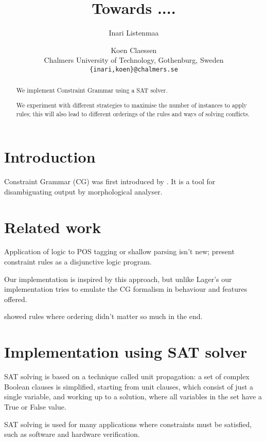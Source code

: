 \documentclass[11pt]{article}
\title{Towards ....}
\author{Inari Listenmaa \and Koen Claessen \\
  Chalmers University of Technology, Gothenburg, Sweden \\
  {\tt \{inari,koen\}@chalmers.se} }
\date{}
\begin{document}
\maketitle
\begin{abstract}
We implement Constraint Grammar using a SAT solver.

We experiment with different strategies to maximise the number of instances to apply rules;
this will also lead to different orderings of the rules and ways of solving conflicts.


\end{abstract}


\section{Introduction}
Constraint Grammar (CG) was first introduced by \cite{karlsson1995constraint}. 
It is a tool for disambiguating output by morphological analyser.


\section{Related work}
\label{sect:related}

Application of logic to POS tagging or shallow parsing isn't new;
\cite{lager98, lager_nivre01} present constraint rules as 
a disjunctive logic program.

Our implementation is inspired by this approach,
but unlike Lager's our implementation tries to emulate the CG
formalism in behaviour and features offered.

\cite{lager01transformation} showed rules where ordering didn't matter so much in the end.



\section{Implementation using SAT solver}
\label{sect:pdf}

SAT solving is based on a technique called unit propagation:
a set of complex Boolean clauses is simplified, starting from unit
clauses, which consist of just a single variable, and working up to a
solution, where all variables in the set have a True or False value.

SAT solving is used for many applications where constraints must be
satisfied, such as software and hardware verification.
\end{document}
